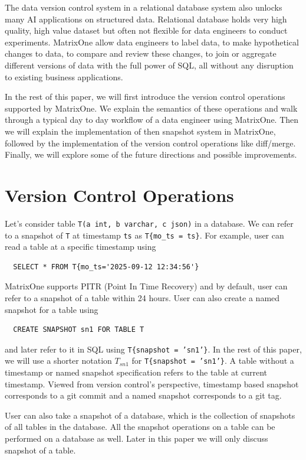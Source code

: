 \documentclass[sigconf,nonacm]{acmart} %
\begin{document}
The data version control system in a relational database system also unlocks
many AI applications on structured data.  Relational database holds very 
high quality, high value dataset but often not flexible for data engineers
to conduct experiments.  MatrixOne allow data engineers to label data, 
to make hypothetical changes to data, to compare and review these changes,
to join or aggregate different versions of data with the full power of SQL,
all without any disruption to existing business applications.

In the rest of this paper, we will first introduce the version control operations
supported by MatrixOne.  We explain the semantics of these operations and 
walk through a typical day to day workflow of a data engineer using MatrixOne.
Then we will explain the implementation of then snapshot system in 
MatrixOne, followed by the implementation of the version control 
operations like diff/merge.  Finally, we will explore some of the 
future directions and possible improvements.

\section{Version Control Operations}\label{sec:vcop}
Let's consider table \texttt{T(a int, b varchar, c json)} in a database.  
We can refer to a snapshot of \texttt{T} at timestamp
\texttt{ts} as \texttt{T\{mo\_ts = ts\}}.  For example, user can read a table 
at a specific timestamp using 
\begin{verbatim}
  SELECT * FROM T{mo_ts='2025-09-12 12:34:56'}
\end{verbatim}
MatrixOne supports PITR (Point In Time Recovery) and by default, user can refer
to a snapshot of a table within 24 hours.  User can also create a named snapshot
for a table using 
\begin{verbatim}
  CREATE SNAPSHOT sn1 FOR TABLE T
\end{verbatim}  
and later refer to it in SQL using \texttt{T\{snapshot = 'sn1'\}}.  
In the rest of this paper, we will use a shorter notation 
$T_{sn1}$ for  \texttt{T\{snapshot = 'sn1'\}}. 
A table without a timestamp or named snapshot specification refers to the table
at current timestamp. Viewed from version control's perspective, timestamp based snapshot
corresponds to a git commit and a named snapshot corresponds to a git tag.

User can also take a snapshot of a database, which is the collection of snapshots 
of all tables in the database.  All the snapshot operations on a table can be performed
on a database as well.  Later in this paper we will only discuss 
snapshot of a table.
\end{document}

